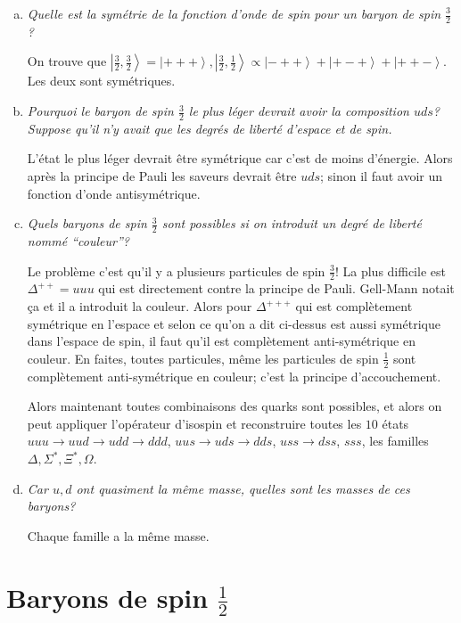 \documentclass[10pt]{report}
\newcommand{\ket}[1]{\left|#1\right>}
\begin{document}
\begin{enumerate}[a)]
    \item \emph{Quelle est la sym\'etrie de la fonction d'onde de spin pour un baryon de spin $\frac{3}{2}$?}

        On trouve que $\ket{\frac{3}{2}, \frac{3}{2}} = \ket{+++}, \ket{\frac{3}{2}, \frac{1}{2}} \propto \ket{-++} + \ket{+ - +} + \ket{++ -}$. Les deux sont sym\'etriques.

    \item \emph{Pourquoi le baryon de spin $\frac{3}{2}$ le plus l\'eger devrait avoir la composition $uds$? Suppose qu'il n'y avait que les degr\'es de libert\'e d'espace et de spin.}

        L'\'etat le plus l\'eger devrait \^etre sym\'etrique car c'est de moins d'\'energie. Alors apr\`es la principe de Pauli les saveurs devrait \^etre $uds$; sinon il faut avoir un fonction d'onde antisym\'etrique.


    \item \emph{Quels baryons de spin $\frac{3}{2}$ sont possibles si on introduit un degr\'e de libert\'e nomm\'e ``couleur''?}

        Le probl\`eme c'est qu'il y a plusieurs particules de spin $\frac{3}{2}$! La plus difficile est $\Delta^{++} = uuu$ qui est directement contre la principe de Pauli. Gell-Mann notait \c{c}a et il a introduit la couleur. Alors pour $\Delta^{+++}$ qui est compl\`etement sym\'etrique en l'espace et selon ce qu'on a dit ci-dessus est aussi sym\'etrique dans l'espace de spin, il faut qu'il est compl\`etement anti-sym\'etrique en couleur. En faites, toutes particules, m\^eme les particules de spin $\frac{1}{2}$ sont compl\`etement anti-sym\'etrique en couleur; c'est la principe d'accouchement.

        Alors maintenant toutes combinaisons des quarks sont possibles, et alors on peut appliquer l'op\'erateur d'isospin et reconstruire toutes les $10$ \'etats $uuu \to uud \to udd \to ddd$, $uus \to uds \to dds$, $uss \to dss$, $sss$, les familles $\Delta, \Sigma^*, \Xi^*, \Omega$. 

    \item \emph{Car $u,d$ ont quasiment la m\^eme masse, quelles sont les masses de ces baryons?}

        Chaque famille a la m\^eme masse.
\end{enumerate}

\section{Baryons de spin $\frac{1}{2}$}
\end{document}
